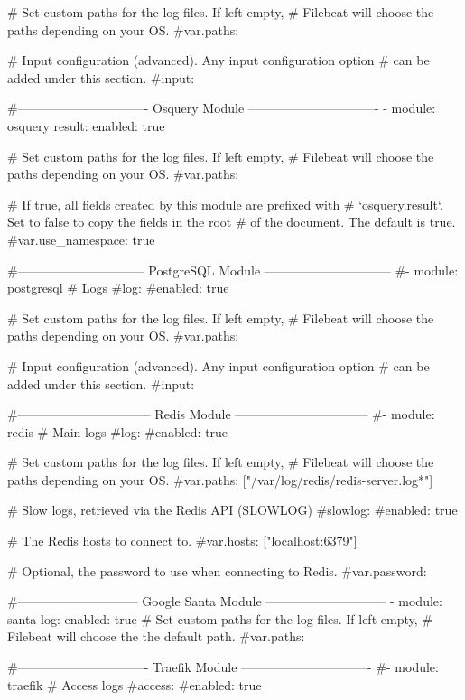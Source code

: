     # Set custom paths for the log files. If left empty,
    # Filebeat will choose the paths depending on your OS.
    #var.paths:

    # Input configuration (advanced). Any input configuration option
    # can be added under this section.
    #input:

#------------------------------- Osquery Module -------------------------------
- module: osquery
  result:
    enabled: true

    # Set custom paths for the log files. If left empty,
    # Filebeat will choose the paths depending on your OS.
    #var.paths:

    # If true, all fields created by this module are prefixed with
    # `osquery.result`. Set to false to copy the fields in the root
    # of the document. The default is true.
    #var.use_namespace: true

#------------------------------ PostgreSQL Module ------------------------------
#- module: postgresql
  # Logs
  #log:
    #enabled: true

    # Set custom paths for the log files. If left empty,
    # Filebeat will choose the paths depending on your OS.
    #var.paths:

    # Input configuration (advanced). Any input configuration option
    # can be added under this section.
    #input:

#-------------------------------- Redis Module --------------------------------
#- module: redis
  # Main logs
  #log:
    #enabled: true

    # Set custom paths for the log files. If left empty,
    # Filebeat will choose the paths depending on your OS.
    #var.paths: ["/var/log/redis/redis-server.log*"]

  # Slow logs, retrieved via the Redis API (SLOWLOG)
  #slowlog:
    #enabled: true

    # The Redis hosts to connect to.
    #var.hosts: ["localhost:6379"]

    # Optional, the password to use when connecting to Redis.
    #var.password:

#----------------------------- Google Santa Module -----------------------------
- module: santa
  log:
    enabled: true
    # Set custom paths for the log files. If left empty,
    # Filebeat will choose the the default path.
    #var.paths:

#------------------------------- Traefik Module -------------------------------
#- module: traefik
  # Access logs
  #access:
    #enabled: true

